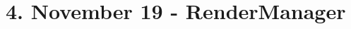 \chapter{4. November 19 -\/ Render\+Manager}
\hypertarget{md_updates_2_november__19}{}\label{md_updates_2_november__19}
\label{md_updates_2_november__19_autotoc_md7}%
%
